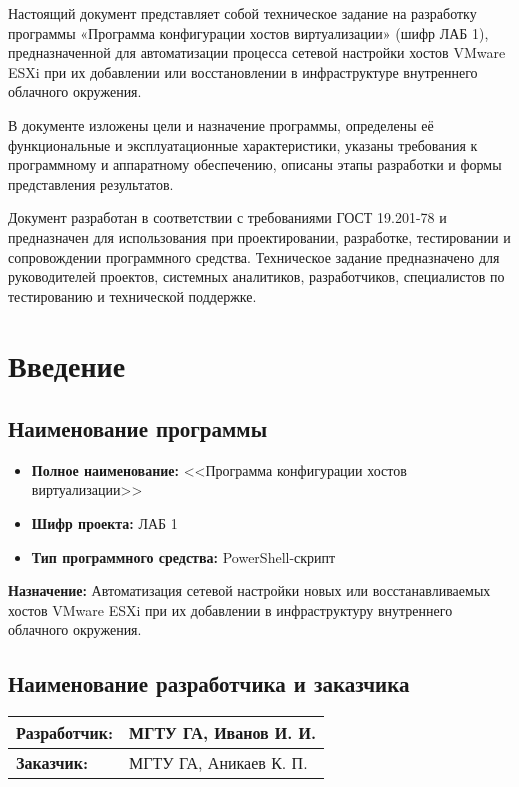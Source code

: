 \newpage\annotation

Настоящий документ представляет собой техническое задание на разработку программы «Программа конфигурации хостов виртуализации» (шифр ЛАБ 1), предназначенной для автоматизации процесса сетевой настройки хостов VMware ESXi при их добавлении или восстановлении в инфраструктуре внутреннего облачного окружения.

В документе изложены цели и назначение программы, определены её функциональные и эксплуатационные характеристики, указаны требования к программному и аппаратному обеспечению, описаны этапы разработки и формы представления результатов.

Документ разработан в соответствии с требованиями ГОСТ 19.201-78 и предназначен для использования при проектировании, разработке, тестировании и сопровождении программного средства. Техническое задание предназначено для руководителей проектов, системных аналитиков, разработчиков, специалистов по тестированию и технической поддержке.

\newpage
\section{Введение}

\subsection{Наименование программы}
\begin{itemize}
    \item \textbf{Полное наименование:} <<Программа конфигурации хостов виртуализации>>
    \item \textbf{Шифр проекта:} ЛАБ 1
    \item \textbf{Тип программного средства:} PowerShell-скрипт
\end{itemize}

\textbf{Назначение:} Автоматизация сетевой настройки новых или восстанавливаемых хостов VMware ESXi при их добавлении в инфраструктуру внутреннего облачного окружения.

\subsection{Наименование разработчика и заказчика}
\begin{table}[h]
\centering
\begin{tabular}{|l|l|}
\hline
\textbf{Разработчик:} & МГТУ ГА, Иванов И. И. \\ \hline
\textbf{Заказчик:} & МГТУ ГА, Аникаев  К. П. \\ \hline
\end{tabular}
\end{table}

